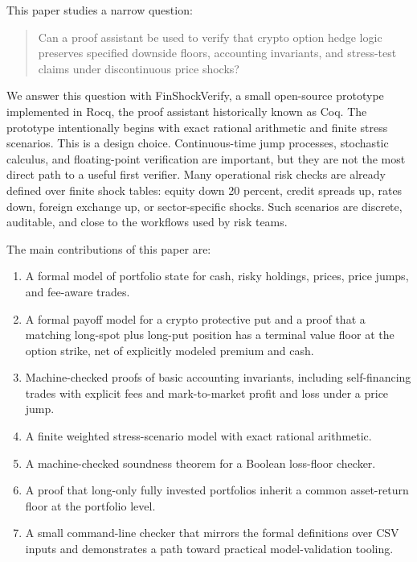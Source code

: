 \documentclass[11pt]{article}
\begin{document}
This paper studies a narrow question:

\begin{quote}
Can a proof assistant be used to verify that crypto option hedge logic
preserves specified downside floors, accounting invariants, and stress-test
claims under discontinuous price shocks?
\end{quote}

We answer this question with FinShockVerify, a small open-source prototype
implemented in Rocq, the proof assistant historically known as Coq. The
prototype intentionally begins with exact rational arithmetic and finite stress
scenarios. This is a design choice. Continuous-time jump processes, stochastic
calculus, and floating-point verification are important, but they are not the
most direct path to a useful first verifier. Many operational risk checks are
already defined over finite shock tables: equity down 20 percent, credit spreads
up, rates down, foreign exchange up, or sector-specific shocks. Such scenarios
are discrete, auditable, and close to the workflows used by risk teams.

The main contributions of this paper are:

\begin{enumerate}
  \item A formal model of portfolio state for cash, risky holdings, prices,
  price jumps, and fee-aware trades.
  \item A formal payoff model for a crypto protective put and a proof that a
  matching long-spot plus long-put position has a terminal value floor at the
  option strike, net of explicitly modeled premium and cash.
  \item Machine-checked proofs of basic accounting invariants, including
  self-financing trades with explicit fees and mark-to-market profit and loss
  under a price jump.
  \item A finite weighted stress-scenario model with exact rational arithmetic.
  \item A machine-checked soundness theorem for a Boolean loss-floor checker.
  \item A proof that long-only fully invested portfolios inherit a common
  asset-return floor at the portfolio level.
  \item A small command-line checker that mirrors the formal definitions over
  CSV inputs and demonstrates a path toward practical model-validation
  tooling.
\end{enumerate}
\end{document}
